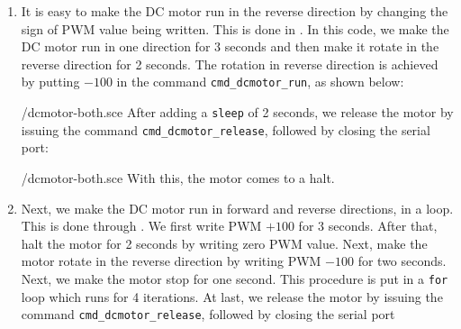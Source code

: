 \begin{enumerate}
  \item It is easy to make the DC motor run in the reverse direction by
        changing the sign of PWM value being written.  This is done in
        .  In this code, we make the DC motor
        run in one direction for 3 seconds and then make it rotate in the
        reverse direction for 2 seconds.  The rotation in reverse direction
        is achieved by putting $- 100$ in the command {\tt cmd\_dcmotor\_run}, 
        as shown below:
        
        {\LocDCMscicode/dcmotor-both.sce}
        After adding a {\tt sleep} of 2 seconds, we release the motor by issuing
        the command {\tt cmd\_dcmotor\_release}, followed by closing the serial port:
        
        {\LocDCMscicode/dcmotor-both.sce}
        With this, the motor comes to a halt.  
        
  \item Next, we make the DC motor run in forward and reverse
        directions, in a loop.  This is done through
        .  We first write PWM $+100$ for 3
        seconds.  After that, halt the motor for 2 seconds by writing zero PWM value.  
        Next, make the motor rotate in the reverse direction by writing PWM $-100$ for two seconds.  
        Next, we make the motor stop for one second. This procedure is put in a {\tt for} loop which runs for 4 iterations.
        At last, we release the motor by issuing the command {\tt cmd\_dcmotor\_release}, followed by closing the serial port
        
\end{enumerate}


